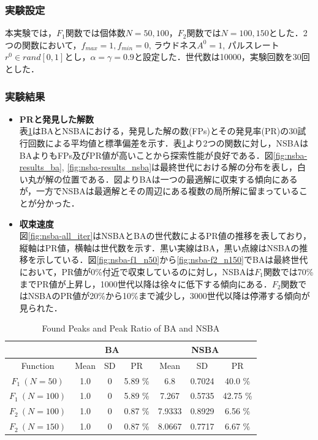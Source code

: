 \documentclass[a4j,11pt]{jarticle}
\begin{document}
\subsubsection{実験設定}
\label{sss:nsba-setup}
本実験では，$F_1$関数では個体数$N=50,100$，$F_2$関数では$N=100,150$とした．2つの関数において，$f_{max}=1, f_{min}=0$, ラウドネス$A^0=1$, パルスレート$r^0 \in rand[0,1]$とし，$\alpha = \gamma = 0.9$と設定した．世代数は10000，実験回数を30回とした．

\subsubsection{実験結果}
\label{sss:nsba-results}
\begin{itemize}
\item {\bf PRと発見した解数} \\
表\ref{tab:nsba}はBAとNSBAにおける，発見した解の数(FPs)とその発見率(PR)の30試行回数による平均値と標準偏差を示す．表\ref{tab:nsba}より2つの関数に対し，NSBAはBAよりもFPs及びPR値が高いことから探索性能が良好である．図\ref{fig:nsba-results_ba}, \ref{fig:nsba-results_nsba}は最終世代における解の分布を表し，白い丸が解の位置である．図よりBAは一つの最適解に収束する傾向にあるが，一方でNSBAは最適解とその周辺にある複数の局所解に留まっていることが分かった．
\item {\bf 収束速度} \\
図\ref{fig:nsba-all_iter}はNSBAとBAの世代数によるPR値の推移を表しており，縦軸はPR値，横軸は世代数を示す．黒い実線はBA，黒い点線はNSBAの推移を示している．図\ref{fig:nsba-f1_n50}から\ref{fig:nsba-f2_n150}でBAは最終世代において，PR値が0\%付近で収束しているのに対し，NSBAは$F_1$関数では70\%までPR値が上昇し，1000世代以降は徐々に低下する傾向にある．$F_2$関数ではNSBAのPR値が20\%から10\%まで減少し，3000世代以降は停滞する傾向が見られた．
\end{itemize}  

\begin{table}[h]
\caption{Found Peaks and Peak Ratio of BA and NSBA}
\begin{center}
\begin{tabular}{c|c|c|c|c|c|c}
\hline
\multicolumn{1}{c|}{} & \multicolumn{3}{c|}{BA} & \multicolumn{3}{c}{NSBA}  \\
\hline
Function & Mean & SD & PR & Mean & SD & PR \\
\hline
$F_1 \ (N=50)$ & 1.0 & 0 & 5.89 \% & 6.8 & 0.7024 & 40.0 \% \\
\hline
$F_1 \ (N=100)$ & 1.0 & 0 & 5.89 \% & 7.267 & 0.5735 & 42.75 \% \\
\hline
$F_2 \ (N=100)$ & 1.0 & 0 & 0.87 \% & 7.9333 & 0.8929 & 6.56 \% \\
\hline
$F_2 \ (N=150)$ & 1.0 & 0 & 0.87 \% & 8.0667 & 0.7717 & 6.67 \% \\
\hline
\end{tabular}
\label{tab:nsba}
\end{center}
\end{table}
\end{document}
